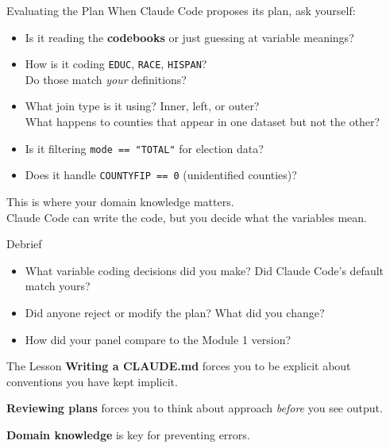 \documentclass[aspectratio=169, 11pt]{beamer}
\begin{document}
\begin{frame}{Evaluating the Plan}
  When Claude Code proposes its plan, ask yourself:

  \vspace{0.5em}
  \begin{itemize}
    \item Is it reading the \textbf{codebooks} or just guessing at variable meanings?
    \item How is it coding \texttt{EDUC}, \texttt{RACE}, \texttt{HISPAN}?\\
      {\small Do those match \textit{your} definitions?}
    \item What join type is it using? Inner, left, or outer?\\
      {\small What happens to counties that appear in one dataset but not the other?}
    \item Is it filtering \texttt{mode == "TOTAL"} for election data?
    \item Does it handle \texttt{COUNTYFIP == 0} (unidentified counties)?
  \end{itemize}

  \vspace{0.5em}
  \alert{This is where your domain knowledge matters.}\\
  Claude Code can write the code, but you decide what the variables mean.
\end{frame}


\begin{frame}{Debrief}
  \begin{itemize}
    \item What variable coding decisions did you make? Did Claude Code's default match yours?
    \item Did anyone reject or modify the plan? What did you change?
    \item How did your panel compare to the Module 1 version?
  \end{itemize}

  \vspace{0.8em}
  \begin{block}{The Lesson}
    \textbf{Writing a CLAUDE.md} forces you to be explicit about conventions you have kept implicit.

    \vspace{0.3em}
    \textbf{Reviewing plans} forces you to think about approach \textit{before} you see output.

    \vspace{0.3em}
    \textbf{Domain knowledge} is key for preventing errors.
  \end{block}
\end{frame}
\end{document}
